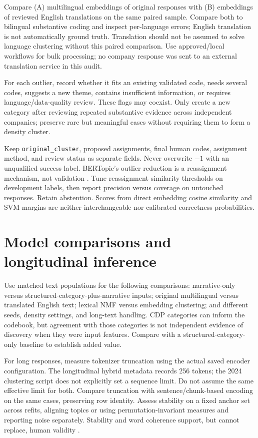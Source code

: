 \documentclass[11pt,a4paper]{article}
\begin{document}
Compare (A) multilingual embeddings of original responses with
(B) embeddings of reviewed English translations on the same paired sample.
Compare both to bilingual substantive coding and inspect per-language
errors; English translation is not automatically ground truth.
Translation should not be assumed to solve language clustering without
this paired comparison. Use approved/local workflows for bulk processing;
no company response was sent to an external translation service in this audit.

For each outlier, record whether it fits an existing validated code, needs
several codes, suggests a new theme, contains insufficient information, or
requires language/data-quality review. These flags may coexist.
Only create a new category after reviewing repeated substantive evidence
across independent companies; preserve rare but meaningful cases without
requiring them to form a density cluster.

Keep \texttt{original\_cluster}, proposed assignments, final human codes,
assignment method, and review status as separate fields. Never overwrite
$-1$ with an unqualified success label. BERTopic's outlier reduction is a
reassignment mechanism, not validation \cite{bertopic}.
Tune reassignment similarity thresholds on development labels, then report
precision versus coverage on untouched responses. Retain abstention.
Scores from direct embedding cosine similarity and SVM margins are neither
interchangeable nor calibrated correctness probabilities.

\section{Model comparisons and longitudinal inference}
Use matched text populations for the following comparisons: narrative-only
versus structured-category-plus-narrative inputs; original multilingual
versus translated English text; lexical NMF versus embedding clustering;
and different seeds, density settings, and long-text handling.
CDP categories can inform the codebook, but agreement with those categories
is not independent evidence of discovery when they were input features.
Compare with a structured-category-only baseline to establish added value.

For long responses, measure tokenizer truncation using the actual saved
encoder configuration. The longitudinal hybrid metadata records 256 tokens;
the 2024 clustering script does not explicitly set a sequence limit.
Do not assume the same effective limit for both. Compare truncation with
sentence/chunk-based encoding on the same cases, preserving row identity.
Assess stability on a fixed anchor set across refits, aligning topics or
using permutation-invariant measures and reporting noise separately.
Stability and word coherence support, but cannot replace, human validity
\cite{grimmer}.
\end{document}
